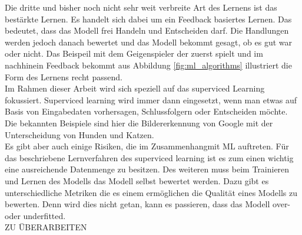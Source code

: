 \begin{onehalfspace}
        Die dritte und bisher noch nicht sehr weit verbreite Art des Lernens ist das bestärkte Lernen. Es handelt sich dabei um ein Feedback basiertes Lernen. Das bedeutet, dass das Modell frei Handeln und Entscheiden darf. Die Handlungen werden jedoch danach bewertet und das Modell bekommt gesagt, ob es gut war oder nicht. Das Beispeil mit dem Geigenspieler der zuerst spielt und im nachhinein Feedback bekommt aus Abbildung \ref*{fig:ml_algorithms} illustriert die Form des Lernens recht passend. 
        \\
        Im Rahmen dieser Arbeit wird sich speziell auf das superviced Learning fokussiert. Superviced learning wird immer dann eingesetzt, wenn man etwas auf Basis von Eingabedaten vorhersagen, Schlussfolgern oder Entscheiden möchte. Die bekannten Beispiele sind hier die Bildererkennung von Google mit der Unterscheidung von Hunden und Katzen. 
        \\
        Es gibt aber auch einige Risiken, die im Zusammenhangmit \ac{ML} auftreten. Für das beschriebene Lernverfahren des superviced learning ist es zum einen wichtig eine ausreichende Datenmenge zu besitzen. 
        Des weiteren muss beim Trainieren und Lernen des Modells das Modell selbst bewertet werden. Dazu gibt es unterschiedliche Metriken die es einem ermöglichen die Qualität eines Modells zu bewerten. Denn wird dies nicht getan, kann es passieren, dass das Modell over- oder underfitted. 
        \\
        ZU ÜBERARBEITEN\cite{Döbel2018}\cite{Ng2018}
        \\


\end{onehalfspace}
